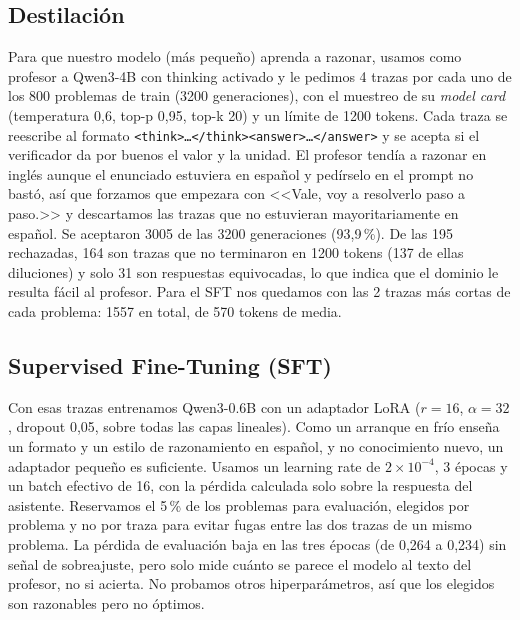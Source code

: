 \subsection{Destilación}
Para que nuestro modelo (más pequeño) aprenda a razonar, usamos como profesor a Qwen3-4B con thinking activado y le pedimos 4 trazas por cada uno de los 800 problemas de train (3200 generaciones), con el muestreo de su \textit{model card} (temperatura 0,6, top-p 0,95, top-k 20) y un límite de 1200 tokens. Cada traza se reescribe al formato \texttt{<think>\dots</think><answer>\dots</answer>} y se acepta si el verificador da por buenos el valor y la unidad. El profesor tendía a razonar en inglés aunque el enunciado estuviera en español y pedírselo en el prompt no bastó, así que forzamos que empezara con <<Vale, voy a resolverlo paso a paso.>> y descartamos las trazas que no estuvieran mayoritariamente en español. Se aceptaron 3005 de las 3200 generaciones (93,9\,\%). De las 195 rechazadas, 164 son trazas que no terminaron en 1200 tokens (137 de ellas diluciones) y solo 31 son respuestas equivocadas, lo que indica que el dominio le resulta fácil al profesor. Para el SFT nos quedamos con las 2 trazas más cortas de cada problema: 1557 en total, de 570 tokens de media.

\subsection{Supervised Fine-Tuning (SFT)}
Con esas trazas entrenamos Qwen3-0.6B con un adaptador LoRA ($r=16$, $\alpha=32$, dropout 0,05, sobre todas las capas lineales). Como un arranque en frío enseña un formato y un estilo de razonamiento en español, y no conocimiento nuevo, un adaptador pequeño es suficiente. Usamos un learning rate de $2 \times 10^{-4}$, 3 épocas y un batch efectivo de 16, con la pérdida calculada solo sobre la respuesta del asistente. Reservamos el 5\,\% de los problemas para evaluación, elegidos por problema y no por traza para evitar fugas entre las dos trazas de un mismo problema. La pérdida de evaluación baja en las tres épocas (de 0,264 a 0,234) sin señal de sobreajuste, pero solo mide cuánto se parece el modelo al texto del profesor, no si acierta. No probamos otros hiperparámetros, así que los elegidos son razonables pero no óptimos.


